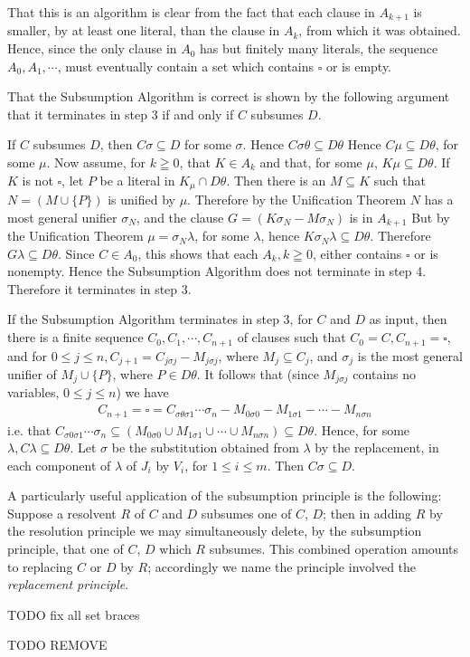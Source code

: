 \documentclass[8pt]{extarticle}
\begin{document}
That this is an algorithm is clear from the fact that each clause in $A_{k+1}$ is smaller, by at least one literal, than the clause in $A_k$, from which it was obtained. Hence, since the only clause in $A_0$ has but finitely many literals, the sequence $A_0, A_1,\dotsm$, must eventually contain a set which contains $\square$ or is empty. 

That the Subsumption Algorithm is correct is shown by the following argument that it terminates in step 3 if and only if $C$ subsumes $D$.

If $C$ subsumes $D$, then $C\sigma\subseteq D$ for some $\sigma$. Hence $C\sigma\theta\subseteq D\theta$ Hence $C\mu\subseteq D\theta$, for some $\mu$. Now assume, for $k\geqq 0$, that $K \in A_k$ and that, for some $\mu$, $K\mu\subseteq D\theta$. If $K$ is not $\square$, let $P$ be a literal in $K_\mu \cap D\theta$. Then there is an $M \subseteq K$ such that $N = (M\cup\{P\})$ is unified by $\mu$. Therefore by the Unification Theorem $N$ has a most general unifier $\sigma_N$, and the clause $G = (K\sigma_N - M\sigma_N)$ is in $A_{k+1}$ But by the Unification Theorem $\mu = \sigma_N\lambda$, for some $\lambda$, hence $K\sigma_N\lambda\subseteq D\theta$. Therefore $G\lambda\subseteq D\theta$. Since $C \in A_0$, this shows that each $A_k, k\geqq 0$, either contains $\square$ or is nonempty. Hence the Subsumption Algorithm does not terminate in step 4. Therefore it terminates in step 3.

If the Subsumption Algorithm terminates in step 3, for $C$ and $D$ as input, then there is a finite sequence
$C_0,C_1,\dotsm,C_{n+1}$ of clauses such that $C_0 = C, C_{n+1} = \square$, and for $0\leq j \leq n, C_{j+1} = C_{j\sigma j} - M_{j\sigma j}$, where $M_j\subseteq C_j$, and $\sigma_j$ is the most general unifier of $M_j \cup\{P\}$, where $P\in D\theta$. It follows that (since $M_{j\sigma j}$ contains no variables, $0\leq j\leq n$) we have
\begin{align*}
    C_{n+1} = \square = C_{\sigma \theta \sigma 1}\dotsm \sigma_n - M_{0\sigma0} - M_{1\sigma 1} - \dotsm - M_{n\sigma n}
\end{align*}
\noindent
i.e. that $C_{\sigma 0\sigma 1}\dotsm\sigma_n\subseteq(M_{0\sigma 0}\cup M_{1\sigma 1}\cup\dotsm\cup M_{n\sigma n})\subseteq D\theta$. Hence, for some $\lambda, C\lambda\subseteq D\theta$. Let $\sigma$ be the substitution obtained from $\lambda$ by the replacement, in each component of $\lambda$ of $J_i$ by $V_i$, for $1\leq i\leq m$. Then $C\sigma\subseteq D$.

A particularly useful application of the subsumption principle is the following: Suppose a resolvent $R$ of $C$ and $D$ subsumes one of $C$, $D$; then in adding 
$R$ by the resolution principle we may simultaneously delete, by the subsumption principle, that one of $C$, $D$ which $R$ subsumes. This combined operation 
amounts to replacing $C$ or $D$ by $R$; accordingly we name the principle involved the \emph{replacement principle}.

\newpage

TODO fix all set braces

TODO REMOVE
\cite{church_1936}
\cite{davis_1960}
\cite{friedman_1963}
\cite{gilmore_1960}
\cite{robinson_1963}



\end{document}
